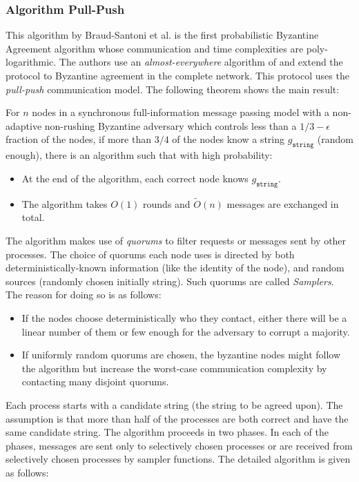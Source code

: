 


\subsubsection{Algorithm Pull-Push \cite{BGH13}}
This algorithm by Braud-Santoni et al. \cite{BGH13} is the first probabilistic Byzantine Agreement algorithm whose communication and time complexities are poly-logarithmic. The authors use an \textit{almost-everywhere} algorithm of \cite{KSSV06} and extend the protocol to Byzantine agreement in the complete network. This protocol uses the \textit{pull-push} communication model. The following theorem shows the main result: 


\begin{theorem}
For $n$ nodes in a synchronous full-information message passing model with a non-adaptive non-rushing Byzantine adversary which controls less than a $1/3 - \epsilon$ fraction of the nodes, if more than $3/4$ of the nodes know a string $g_{\mathtt{string}}$ (random enough), there is an algorithm such that with high probability:
\begin{itemize}
\item At the end of the algorithm, each correct node knows $g_{\mathtt{string}}$.
\item The algorithm takes $O(1)$ rounds and $\tilde{O}(n)$ messages are exchanged in total. 
\end{itemize}
\end{theorem}

The algorithm makes use of \textit{quorums} to filter requests or messages sent by other processes. The choice of quorums each node uses is directed by both deterministically-known information (like the identity of the node), and random sources (randomly chosen initially string). Such quorums are called \textit{Samplers}. The reason for doing so is as follows:
\begin{itemize}
\item If the nodes choose deterministically who they contact, either there will be a linear number of them or few enough for the adversary to corrupt a majority. 
\item If uniformly random quorums are chosen, the byzantine nodes might follow the algorithm but increase the worst-case communication complexity by contacting many disjoint quorums. 
\end{itemize}

Each process starts with a candidate string (the string to be agreed upon). The assumption is that more than half of the processes are both correct and have the same candidate string. The algorithm proceeds in two phases. In each of the phases, messages are sent only to selectively chosen processes or are received from selectively chosen processes by sampler functions. The detailed algorithm is given as follows:


